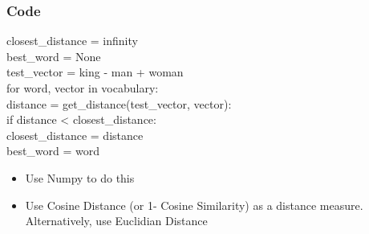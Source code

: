 \documentclass[compress, aspectratio=54]{beamer}
\begin{document}
\begin{frame}
\frametitle{Code}

closest\_distance = infinity\\
best\_word = None\\
test\_vector = king - man + woman\\
for word, vector in vocabulary:\\
\hspace{10 mm}distance = get\_distance(test\_vector, vector):\\
\hspace{10 mm}if distance < closest\_distance:\\
\hspace{20 mm}closest\_distance = distance\\
\hspace{20 mm}best\_word = word\\
\vspace{10 mm}
\begin{itemize}
\item Use Numpy to do this
\item Use Cosine Distance  (or 1- Cosine Similarity) as a distance measure. Alternatively, use Euclidian Distance
\end{itemize}

\end{frame}
\end{document}
